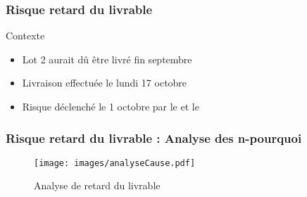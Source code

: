 \begin{frame}
\frametitle{Risque retard du livrable}
\begin{block}{Contexte}
\begin{itemize}
\item Lot 2 aurait dû être livré fin septembre
\item Livraison effectuée le lundi 17 octobre
\item Risque déclenché le 1 octobre par le \RQ{} et le \CP{}
\end{itemize}
\end{block}
\end{frame}

\begin{frame}
\frametitle{Risque retard du livrable : Analyse des n-pourquoi}
	\begin{figure}[!h]
		\begin{center}
			\texttt{[image: images/analyseCause.pdf]}
			\caption{Analyse de retard du livrable}
		\end{center}
	\end{figure}
\end{frame}

